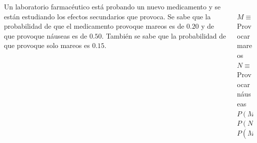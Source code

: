 \documentclass[aspectratio=149,10pt,xcolor=dvipsnames,t]{beamer}
\begin{document}
\begin{frame}
	\begin{columns}
		\begin{column}[T]{0.7\textwidth}
			Un laboratorio farmacéutico está probando un nuevo medicamento y se están estudiando los efectos secundarios que
			provoca.
			Se sabe que la probabilidad de que el medicamento provoque mareos es de $0.20$ y de que provoque náuseas es de $0.50$.
			También se sabe que la probabilidad de que provoque solo mareos es $0.15$.
		\end{column}
		\begin{column}[T]{0.3\textwidth}
			\\
			$M \equiv$ Provocar mareos\\
			$N \equiv$ Provocar náuseas\\
			$P(M)=0.2$\\
			$P(N)=0.5$\\
			$P(M\cap \overline N)=0.15$
		\end{column}
	\end{columns}
\end{frame}
\end{document}

